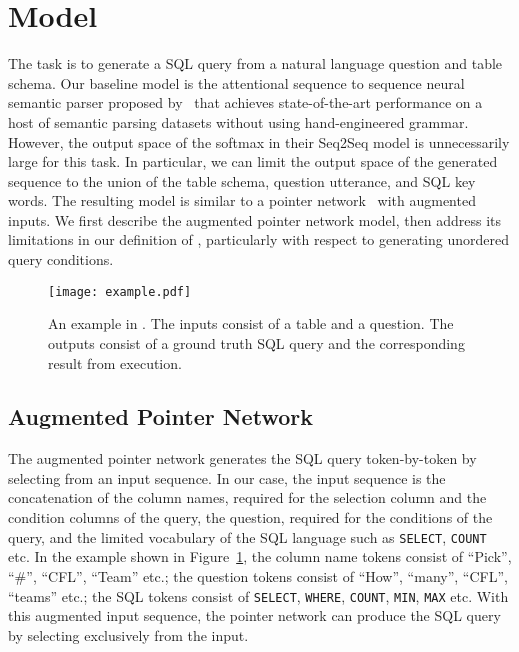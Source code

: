 \documentclass{article} %
\begin{document}
\section{Model}
The \dataset task is to generate a SQL query from a natural language question and table schema.
Our baseline model is the attentional sequence to sequence neural semantic parser proposed by~\citet{dong-neural_semantic_parsing} that achieves state-of-the-art performance on a host of semantic parsing datasets without using hand-engineered grammar.
However, the output space of the softmax in their Seq2Seq model is unnecessarily large for this task.
In particular, we can limit the output space of the generated sequence to the union of the table schema, question utterance, and SQL key words.
The resulting model is similar to a pointer network~\citep{vinyals-pointer_networks} with augmented inputs.
We first describe the augmented pointer network model, then address its limitations in our definition of \model, particularly with respect to generating unordered query conditions.


\begin{figure}[t!]
  \vspace{-2mm}
  \begin{center}
	\texttt{[image: example.pdf]}
  \end{center}
  \vspace{-5mm}
  \caption{
  An example in \dataset. The inputs consist of a table and a question. The outputs consist of a ground truth SQL query and the corresponding result from execution.
}\label{fig:example}
  \vspace{-5mm}
\end{figure}


\subsection{Augmented Pointer Network}
\label{section:augpointer}


The augmented pointer network generates the SQL query token-by-token by selecting from an input sequence.
In our case, the input sequence is the concatenation of the column names, required for the selection column and the condition columns of the query,
the question, required for the conditions of the query,
and the limited vocabulary of the SQL language such as \texttt{SELECT}, \texttt{COUNT} etc.
In the example shown in Figure~\ref{fig:example},
the column name tokens consist of ``Pick'', ``\#'', ``CFL'', ``Team'' etc.;
the question tokens consist of ``How'', ``many'', ``CFL'', ``teams'' etc.;
the SQL tokens consist of \texttt{SELECT}, \texttt{WHERE}, \texttt{COUNT}, \texttt{MIN}, \texttt{MAX} etc.
With this augmented input sequence, the pointer network can produce the SQL query by selecting exclusively from the input.
\end{document}
